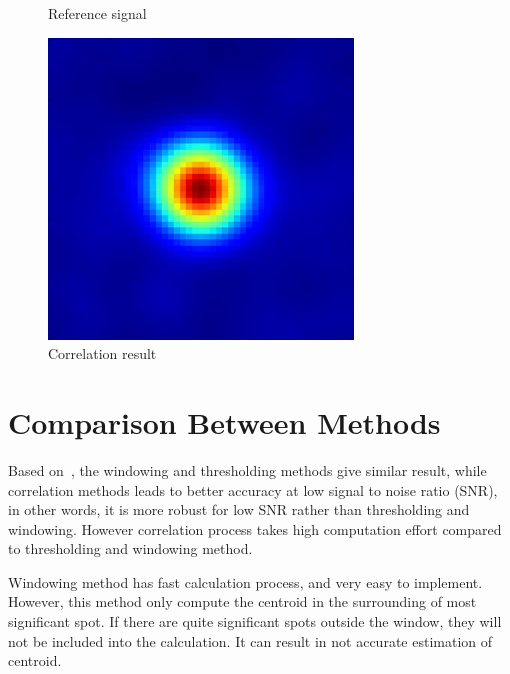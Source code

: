 \documentclass{article}
\begin{document}
\begin{figure}[H]
\begin{minipage}[t]{0.3\textwidth}
\caption{Reference signal}
\label{fig:reference}
\end{minipage}
\hspace{\fill}
\begin{minipage}[t]{0.3\textwidth}
\centering
\includegraphics[width=\linewidth]{figures/correlation}
\caption{Correlation result}
\label{fig:correlation}
\end{minipage}
\end{figure}

\section{Comparison Between Methods}

Based on~\cite{thomas04}, the windowing and thresholding methods give similar result, while correlation methods leads to better accuracy at low signal to noise ratio (SNR), in other words, it is more robust for low SNR rather than thresholding and windowing. However correlation process takes high computation effort compared to thresholding and windowing method.

Windowing method has fast calculation process, and very easy to implement. However, this method only compute the centroid in the surrounding of most significant spot. If there are quite significant spots outside the window, they will not be included into the calculation. It can result in not accurate estimation of centroid.
\end{document}
